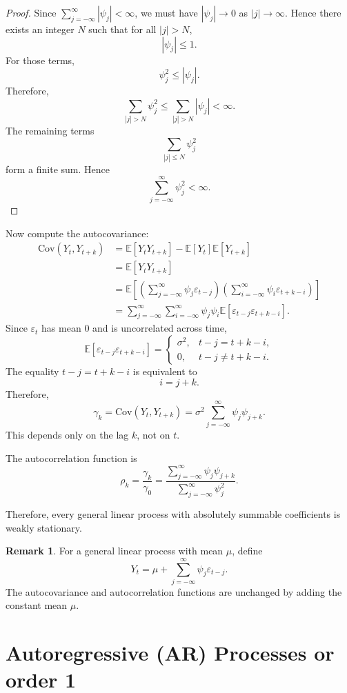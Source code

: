 \documentclass[12pt,oneside]{book}
\numberwithin{equation}{section}
\theoremstyle{definition}
\newtheorem{remark}{Remark}[section]
\theoremstyle{plain}
\theoremstyle{remark}
\newcommand{\E}{\mathbb{E}}
\newcommand{\Cov}{\mathrm{Cov}}
\begin{document}
\begin{proof}
Since $\sum_{j=-\infty}^{\infty}|\psi_j|<\infty$, we must have $|\psi_j|\to 0$ as $|j|\to\infty$. Hence there exists an integer $N$ such that for all $|j|>N$,
\[
|\psi_j|\leq 1.
\]
For those terms,
\[
\psi_j^2\leq |\psi_j|.
\]
Therefore,
\[
\sum_{|j|>N}\psi_j^2
\leq
\sum_{|j|>N}|\psi_j|
<\infty.
\]
The remaining terms
\[
\sum_{|j|\leq N}\psi_j^2
\]
form a finite sum. Hence
\[
\sum_{j=-\infty}^{\infty}\psi_j^2<\infty.
\]
\end{proof}

Now compute the autocovariance:
\begin{align*}
\Cov(Y_t,Y_{t+k})
&=
\E[Y_tY_{t+k}]
-
\E[Y_t]\E[Y_{t+k}] \\
&=
\E[Y_tY_{t+k}] \\
&=
\E\left[
\left(\sum_{j=-\infty}^{\infty}\psi_j\varepsilon_{t-j}\right)
\left(\sum_{i=-\infty}^{\infty}\psi_i\varepsilon_{t+k-i}\right)
\right] \\
&=
\sum_{j=-\infty}^{\infty}
\sum_{i=-\infty}^{\infty}
\psi_j\psi_i
\E[\varepsilon_{t-j}\varepsilon_{t+k-i}].
\end{align*}
Since $\varepsilon_t$ has mean $0$ and is uncorrelated across time,
\[
\E[\varepsilon_{t-j}\varepsilon_{t+k-i}]
=
\begin{cases}
\sigma^2, & t-j=t+k-i,\\
0, & t-j\neq t+k-i.
\end{cases}
\]
The equality $t-j=t+k-i$ is equivalent to
\[
i=j+k.
\]
Therefore,
\[
\gamma_k
=
\Cov(Y_t,Y_{t+k})
=
\sigma^2
\sum_{j=-\infty}^{\infty}
\psi_j\psi_{j+k}.
\]
This depends only on the lag $k$, not on $t$.

The autocorrelation function is
\[
\rho_k
=
\frac{\gamma_k}{\gamma_0}
=
\frac{\sum_{j=-\infty}^{\infty}\psi_j\psi_{j+k}}
{\sum_{j=-\infty}^{\infty}\psi_j^2}.
\]

Therefore, every general linear process with absolutely summable coefficients is weakly stationary.

\begin{remark}
For a general linear process with mean $\mu$, define
\[
Y_t
=
\mu+\sum_{j=-\infty}^{\infty}\psi_j\varepsilon_{t-j}.
\]
The autocovariance and autocorrelation functions are unchanged by adding the constant mean $\mu$.
\end{remark}

\section{Autoregressive (AR) Processes or order 1}
\end{document}
